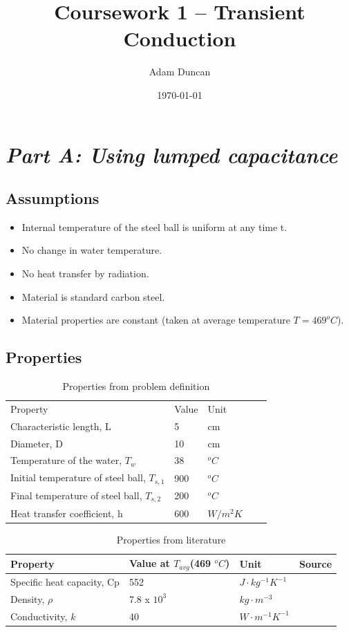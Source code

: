 \documentclass[11pt]{article}
\title{Coursework 1 – Transient Conduction}
\author{Adam Duncan}
\date{\today}
\begin{document}
\maketitle

\section{\emph{Part A: Using lumped capacitance}}
\subsection{Assumptions}
\begin{itemize}
	\item Internal temperature of the steel ball is uniform at any time t.
	\item No change in water temperature.
	\item No heat transfer by radiation.
	\item Material is standard carbon steel.
	\item Material properties are constant (taken at average temperature $T = 469 ^{o}C$).
\end{itemize}
\subsection{Properties}
\begin{table}[h]
	\centering
	\caption{Properties from problem definition}
	\begin{tabular}{lllll}
		Property & Value & Unit &  &  \\ \cline{1-3}
		Characteristic   length, L & 5 & cm &  &  \\
		Diameter, D & 10 & cm &  &  \\
		Temperature   of the water, $T_w$ & 38 & $^oC$ &  &  \\
		Initial   temperature of steel ball, $T_{s,1}$ & 900 & $^oC$ &  &  \\
		Final   temperature of steel ball, $T_{s,2}$ & 200 & $^oC$ &  &  \\
		Heat transfer   coefficient, h & 600 & $W/m^{2}K$ &  & 
	\end{tabular}
	\label{tab1}
\end{table}

\begin{table}[h]
	\centering
	\caption{Properties from literature}
	\begin{tabular}{llll}
		Property & Value at $T_{avg}$(469 $^{o}C$) & Unit & Source \\ \hline
		Specific heat   capacity, Cp & 552 & $J\cdot kg^{-1} K^{-1}$ & \cite{jean-marc_franssen_fire_2015} \\
		Density, $\rho$ & 7.8 x $10^3$ & $kg\cdot m^{-3}$ & \cite{bergman_fundamentals_2011} \\
		Conductivity, $k$ & 40 & $W\cdot m^{-1} K^{-1} $& \cite{jean-marc_franssen_fire_2015}
	\end{tabular}
	\label{tab2}
\end{table}
\FloatBarrier
\end{document}

